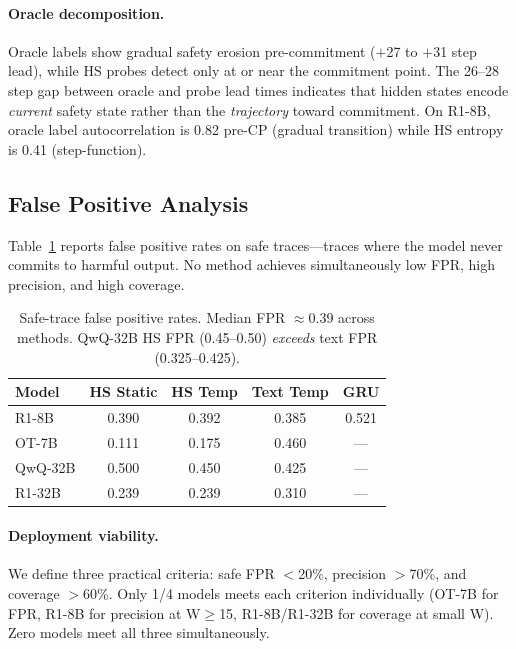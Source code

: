 \documentclass[11pt]{article}
\begin{document}
\paragraph{Oracle decomposition.}
Oracle labels show gradual safety erosion pre-commitment ($+$27 to $+$31 step lead), while HS probes detect only at or near the commitment point. The 26--28 step gap between oracle and probe lead times indicates that hidden states encode \emph{current} safety state rather than the \emph{trajectory} toward commitment. On R1-8B, oracle label autocorrelation is 0.82 pre-CP (gradual transition) while HS entropy is 0.41 (step-function).

\subsection{False Positive Analysis}
\label{sec:fpr}

Table~\ref{tab:fpr_safe} reports false positive rates on safe traces---traces where the model never commits to harmful output. No method achieves simultaneously low FPR, high precision, and high coverage.

\begin{table}[t]
\centering
\small
\begin{tabular}{lcccc}
\toprule
\textbf{Model} & \textbf{HS Static} & \textbf{HS Temp} & \textbf{Text Temp} & \textbf{GRU} \\
\midrule
R1-8B & 0.390 & 0.392 & 0.385 & 0.521 \\
OT-7B & 0.111 & 0.175 & 0.460 & --- \\
QwQ-32B & 0.500 & 0.450 & 0.425 & --- \\
R1-32B & 0.239 & 0.239 & 0.310 & --- \\
\bottomrule
\end{tabular}
\caption{Safe-trace false positive rates. Median FPR $\approx$0.39 across methods. QwQ-32B HS FPR (0.45--0.50) \emph{exceeds} text FPR (0.325--0.425).}
\label{tab:fpr_safe}
\end{table}

\paragraph{Deployment viability.}
We define three practical criteria: safe FPR $<$20\%, precision $>$70\%, and coverage $>$60\%. Only 1/4 models meets each criterion individually (OT-7B for FPR, R1-8B for precision at W$\geq$15, R1-8B/R1-32B for coverage at small W). Zero models meet all three simultaneously.
\end{document}
